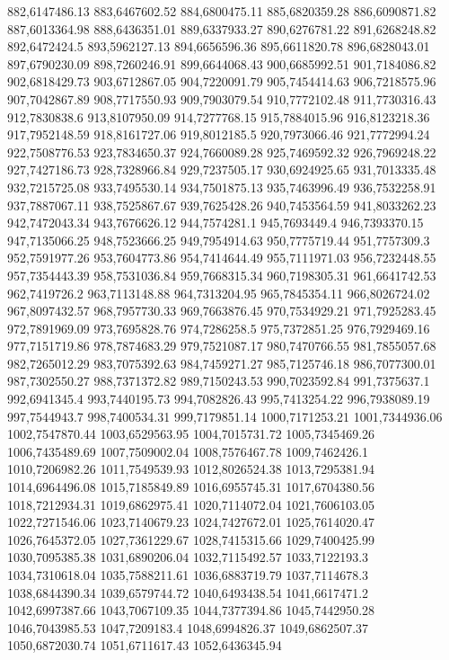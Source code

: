 882,6147486.13
883,6467602.52
884,6800475.11
885,6820359.28
886,6090871.82
887,6013364.98
888,6436351.01
889,6337933.27
890,6276781.22
891,6268248.82
892,6472424.5
893,5962127.13
894,6656596.36
895,6611820.78
896,6828043.01
897,6790230.09
898,7260246.91
899,6644068.43
900,6685992.51
901,7184086.82
902,6818429.73
903,6712867.05
904,7220091.79
905,7454414.63
906,7218575.96
907,7042867.89
908,7717550.93
909,7903079.54
910,7772102.48
911,7730316.43
912,7830838.6
913,8107950.09
914,7277768.15
915,7884015.96
916,8123218.36
917,7952148.59
918,8161727.06
919,8012185.5
920,7973066.46
921,7772994.24
922,7508776.53
923,7834650.37
924,7660089.28
925,7469592.32
926,7969248.22
927,7427186.73
928,7328966.84
929,7237505.17
930,6924925.65
931,7013335.48
932,7215725.08
933,7495530.14
934,7501875.13
935,7463996.49
936,7532258.91
937,7887067.11
938,7525867.67
939,7625428.26
940,7453564.59
941,8033262.23
942,7472043.34
943,7676626.12
944,7574281.1
945,7693449.4
946,7393370.15
947,7135066.25
948,7523666.25
949,7954914.63
950,7775719.44
951,7757309.3
952,7591977.26
953,7604773.86
954,7414644.49
955,7111971.03
956,7232448.55
957,7354443.39
958,7531036.84
959,7668315.34
960,7198305.31
961,6641742.53
962,7419726.2
963,7113148.88
964,7313204.95
965,7845354.11
966,8026724.02
967,8097432.57
968,7957730.33
969,7663876.45
970,7534929.21
971,7925283.45
972,7891969.09
973,7695828.76
974,7286258.5
975,7372851.25
976,7929469.16
977,7151719.86
978,7874683.29
979,7521087.17
980,7470766.55
981,7855057.68
982,7265012.29
983,7075392.63
984,7459271.27
985,7125746.18
986,7077300.01
987,7302550.27
988,7371372.82
989,7150243.53
990,7023592.84
991,7375637.1
992,6941345.4
993,7440195.73
994,7082826.43
995,7413254.22
996,7938089.19
997,7544943.7
998,7400534.31
999,7179851.14
1000,7171253.21
1001,7344936.06
1002,7547870.44
1003,6529563.95
1004,7015731.72
1005,7345469.26
1006,7435489.69
1007,7509002.04
1008,7576467.78
1009,7462426.1
1010,7206982.26
1011,7549539.93
1012,8026524.38
1013,7295381.94
1014,6964496.08
1015,7185849.89
1016,6955745.31
1017,6704380.56
1018,7212934.31
1019,6862975.41
1020,7114072.04
1021,7606103.05
1022,7271546.06
1023,7140679.23
1024,7427672.01
1025,7614020.47
1026,7645372.05
1027,7361229.67
1028,7415315.66
1029,7400425.99
1030,7095385.38
1031,6890206.04
1032,7115492.57
1033,7122193.3
1034,7310618.04
1035,7588211.61
1036,6883719.79
1037,7114678.3
1038,6844390.34
1039,6579744.72
1040,6493438.54
1041,6617471.2
1042,6997387.66
1043,7067109.35
1044,7377394.86
1045,7442950.28
1046,7043985.53
1047,7209183.4
1048,6994826.37
1049,6862507.37
1050,6872030.74
1051,6711617.43
1052,6436345.94
